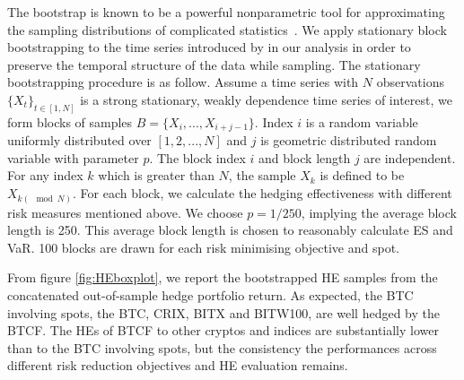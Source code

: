 The bootstrap is known to be a powerful nonparametric tool for approximating the sampling distributions of complicated statistics~\citep{efron1994introduction, davison1997bootstrap}.
We apply stationary block bootstrapping to the time series introduced by \cite{Politis1994} in our analysis in order to preserve the temporal structure of the data while sampling.
The stationary bootstrapping procedure is as follow.
Assume a time series with $N$ observations $\{X_t\}_{t \in [1,N]}$ is a strong stationary, weakly dependence time series of interest,
we form blocks of samples $B = \{X_i, ..., X_{i+j-1}\}$.
Index $i$ is a random variable uniformly distributed over
$[1,2,...,N]$ and $j$ is geometric distributed random variable with parameter $p$.
The block index $i$ and block length $j$ are independent.
For any index $k$ which is greater than $N$, the sample $X_k$ is defined to be $X_{k(\mod N)}$.
For each block, we calculate the hedging effectiveness with different risk measures mentioned above.
We choose $p=1/250$, implying the average block length is 250.
This average block length is chosen to reasonably calculate ES and VaR.
100 blocks are drawn for each risk minimising objective and
spot.

From figure \ref{fig:HEboxplot}, we report the bootstrapped HE samples from the concatenated out-of-sample hedge portfolio return.
As expected, the BTC involving spots, the BTC, CRIX, BITX and BITW100, are well hedged by the BTCF.
The HEs of BTCF to other cryptos and indices are substantially lower than to the BTC involving spots, but the consistency the performances across different risk reduction objectives and HE evaluation remains.



